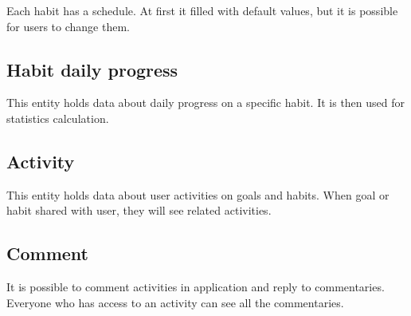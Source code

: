 Each habit has a schedule.
At first it filled with default values, but it is possible for users to change them.

\subsection{Habit daily progress}\label{subsec:habit-daily-progress}

This entity holds data about daily progress on a specific habit.
It is then used for statistics calculation.

\subsection{Activity}\label{subsec:activity}

This entity holds data about user activities on goals and habits.
When goal or habit shared with user, they will see related activities.

\subsection{Comment}\label{subsec:comment}

It is possible to comment activities in application and reply to commentaries.
Everyone who has access to an activity can see all the commentaries.